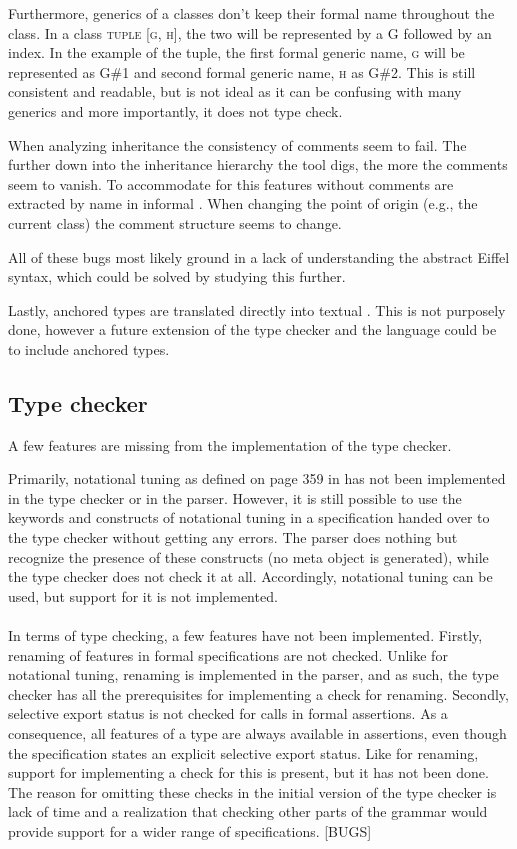 Furthermore, generics of a classes don't keep their formal name throughout the class. In a class \textsc{tuple [g, h]}, the two will be represented by a G followed by an index. In the example of the tuple, the first formal generic name, \textsc{g} will be represented as G\#1 and second formal generic name, \textsc{h} as G\#2. This is still consistent and readable, but is not ideal as it can be confusing with many generics and more importantly, it does not type check.

When analyzing inheritance the consistency of comments seem to fail. The further down into the inheritance hierarchy the tool digs, the more the comments seem to vanish. To accommodate for this features without comments are extracted by name in informal \bon. When changing the point of origin (e.g., the current class) the comment structure seems to change.

All of these bugs most likely ground in a lack of understanding the abstract Eiffel syntax, which could be solved by studying this further.

Lastly, anchored types are translated directly into textual \bon. This is not purposely done, however a future extension of the type checker and the \bon{} language could be to include anchored types.

\subsection{Type checker}
A few features are missing from the implementation of the type checker.

Primarily, notational tuning as defined on page 359 in \cite{walden1995} has not been implemented in the type checker or in the parser. However, it is still possible to use the keywords and constructs of notational tuning in a specification handed over to the type checker without getting any errors. The parser does nothing but recognize the presence of these constructs (no meta object is generated), while the type checker does not check it at all. Accordingly, notational tuning can be used, but support for it is not implemented.
\paragraph{}
In terms of type checking, a few features have not been implemented. Firstly, renaming of features in formal specifications are not checked. Unlike for notational tuning, renaming is implemented in the parser, and as such, the type checker has all the prerequisites for implementing a check for renaming. Secondly, selective export status is not checked for calls in formal assertions. As a consequence, all features of a type are always available in assertions, even though the specification states an explicit selective export status. Like for renaming, support for implementing a check for this is present, but it has not been done. The reason for omitting these checks in the initial version of the type checker is lack of time and a realization that checking other parts of the grammar would provide support for a wider range of specifications.
[BUGS]
